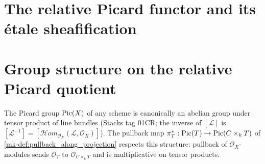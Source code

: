 \section{The relative Picard functor and its \'etale sheafification}
\label{mk-chap:Picard_RelPicFunctor}

\section{Group structure on the relative Picard quotient}
\label{mk-sec:relpic_group}

The Picard group \(\operatorname{Pic}(X)\) of any scheme is canonically an abelian group under
tensor product of line bundles (Stacks tag 01CR; the inverse of \([\mathcal{L}]\)
is $[\mathcal{L}^{-1}] = [\mathcal{H}om_{\mathcal{O}_X}(\mathcal{L},
\mathcal{O}_X)]$). The pullback map
\(\pi_T^* : \operatorname{Pic}(T) \to \operatorname{Pic}(C \times_k T)\) of
\ref{mk-def:pullback_along_projection} respects this structure: pullback of
\(\mathcal{O}_X\)-modules sends \(\mathcal{O}_T\) to \(\mathcal{O}_{C \times_k T}\)
and is multiplicative on tensor products.

